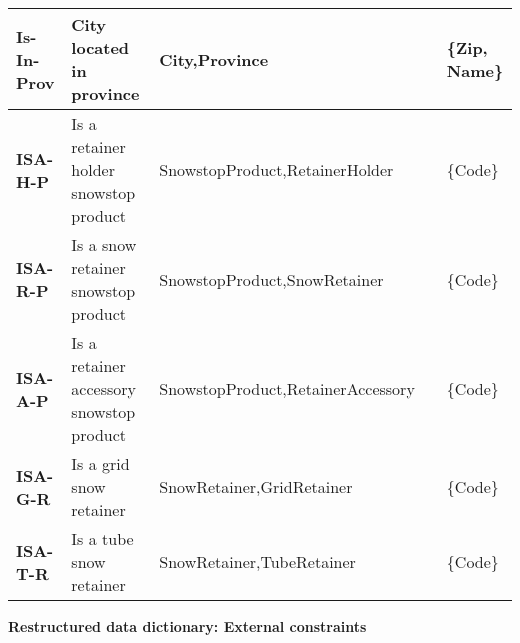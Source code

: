 \begin{table}[H]
\begin{tabular}{ | m{3cm} | m{2.5cm}| m{3.5cm} | m{2.5cm} | m{2cm} |}
    \color[HTML]{3531FF} \textbf{Is-In-Prov} & City located in province & City,\newline Province &  & \{Zip, Name\} \\
    \hline
    \color[HTML]{3531FF} \textbf{ISA-H-P} & Is a retainer holder snowstop product & SnowstopProduct,\newline RetainerHolder &  & \{Code\} \\
    \hline
    \color[HTML]{3531FF} \textbf{ISA-R-P} & Is a snow retainer snowstop product & SnowstopProduct,\newline SnowRetainer &  & \{Code\} \\
    \hline
    \color[HTML]{3531FF} \textbf{ISA-A-P} & Is a retainer accessory snowstop product & SnowstopProduct,\newline RetainerAccessory &  & \{Code\} \\
    \hline
    \color[HTML]{3531FF} \textbf{ISA-G-R} & Is a grid snow retainer & SnowRetainer,\newline GridRetainer &  & \{Code\} \\
    \hline
    \color[HTML]{3531FF} \textbf{ISA-T-R} & Is a tube snow retainer & SnowRetainer,\newline TubeRetainer &  & \{Code\} \\
    \hline
  \end{tabular}
\end{table}

\pagebreak

{\centering \textbf{Restructured data dictionary: External constraints}\\}

